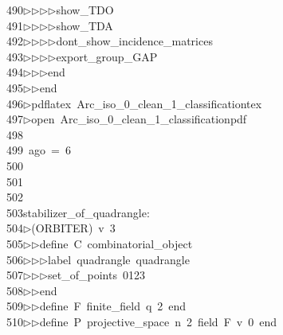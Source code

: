 \begin{tabbing}
490\>$\triangleright$\>$\triangleright$\>$\triangleright$\>$\triangleright$\>show\_TDO\ \\[0pt]
491\>$\triangleright$\>$\triangleright$\>$\triangleright$\>$\triangleright$\>show\_TDA\ \\[0pt]
492\>$\triangleright$\>$\triangleright$\>$\triangleright$\>$\triangleright$\>dont\_show\_incidence\_matrices\ \\[0pt]
493\>$\triangleright$\>$\triangleright$\>$\triangleright$\>$\triangleright$\>export\_group\_GAP\ \\[0pt]
494\>$\triangleright$\>$\triangleright$\>$\triangleright$\>end\ \\[0pt]
495\>$\triangleright$\>$\triangleright$\>end\\[0pt]
496\>$\triangleright$\>pdflatex\ Arc\_iso\_0\_clean\_1\_classificationtex\\[0pt]
497\>$\triangleright$\>open\ Arc\_iso\_0\_clean\_1\_classificationpdf\\[0pt]
498\>\\[0pt]
499\>\ ago\ =\ 6\\[0pt]
500\>\\[0pt]
501\>\\[0pt]
502\>\\[0pt]
503\>stabilizer\_of\_quadrangle:\\[0pt]
504\>$\triangleright$\>(ORBITER)\ v\ 3\ \\[0pt]
505\>$\triangleright$\>$\triangleright$\>define\ C\ combinatorial\_object\ \\[0pt]
506\>$\triangleright$\>$\triangleright$\>$\triangleright$\>label\ quadrangle\ quadrangle\ \\[0pt]
507\>$\triangleright$\>$\triangleright$\>$\triangleright$\>set\_of\_points\ 0123\ \\[0pt]
508\>$\triangleright$\>$\triangleright$\>end\ \\[0pt]
509\>$\triangleright$\>$\triangleright$\>define\ F\ finite\_field\ q\ 2\ end\ \\[0pt]
510\>$\triangleright$\>$\triangleright$\>define\ P\ projective\_space\ n\ 2\ field\ F\ v\ 0\ end\ \\[0pt]

\end{tabbing}
